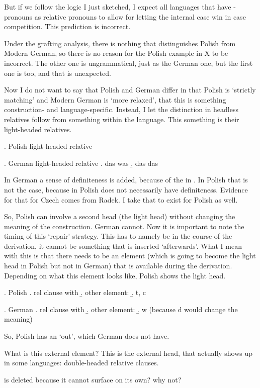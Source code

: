 But if we follow the logic I just sketched, I expect all languages that have -pronouns as relative pronouns to allow for letting the internal case win in case competition. This prediction is incorrect.

Under the grafting analysis, there is nothing that distinguishes Polish from Modern German, so there is no reason for the Polish example in X to be incorrect. The other one is ungrammatical, just as the German one, but the first one is too, and that is unexpected.

Now I do not want to say that Polish and German differ in that Polish is `strictly matching' and Modern German is `more relaxed', that this is something construction- and language-specific. Instead, I let the distinction in headless relatives follow from something within the language. This something is their light-headed relatives.

\ex. Polish light-headed relative

\ex. German light-headed relative
\a. das was
\b. das das

In German a sense of definiteness is added, because of the  in . In Polish that is not the case, because  in Polish does not necessarily have definiteness. Evidence for that for Czech comes from Radek. I take that to exist for Polish as well.

So, Polish can involve a second head (the light head) without changing the meaning of the construction. German cannot. Now it is important to note the timing of this `repair' strategy. This has to namely be in the course of the derivation, it cannot be something that is inserted `afterwards'. What I mean with this is that there needs to be an element (which is going to become the light head in Polish but not in German) that is available during the derivation. Depending on what this element looks like, Polish shows the light head.

\ex. Polish
\a. rel clause with 
\b. other element: 
\b. t, c

\ex. German
\a. rel clause with 
\b. other element: 
\b. w (because d would change the meaning)

So, Polish has an `out', which German does not have.

What is this external element? This is the external head, that actually shows up in some languages: double-headed relative clauses.



 is deleted because it cannot surface on its own? why not?

